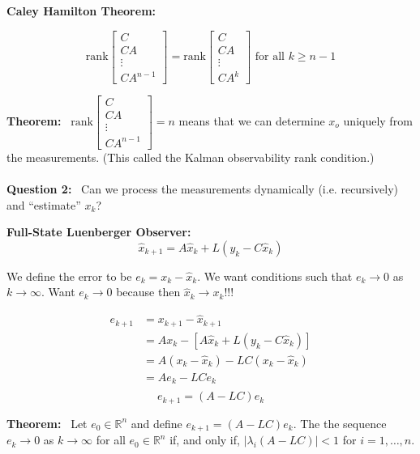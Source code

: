 \documentclass[letterpaper]{article}
\newcommand{\real}{\mathbb R}  %
\begin{document}
\textbf{Caley Hamilton Theorem:}

$$\text{rank} \left[ \begin{array}{c} C \\ CA \\ \vdots \\ CA^{n-1} \end{array} \right] = \text{rank} \left[ \begin{array}{c} C \\ CA \\ \vdots \\ CA^{k} \end{array} \right] \text{ for all } k \ge n-1$$

\textbf{Theorem:}~ $\text{rank} \left[ \begin{array}{c} C \\ CA \\ \vdots \\ CA^{n-1} \end{array} \right] = n$
means that we can determine $x_o$ uniquely from the measurements. (This called the Kalman observability rank condition.) \\ \\

\textbf{Question 2:}~ Can we process the measurements dynamically (i.e. recursively) and ``estimate'' $x_k$?

\textbf{Full-State Luenberger Observer:}
$$\hat{x}_{k+1} = A\hat{x}_k + L(y_k - C\hat{x}_k)$$

We define the error to be $e_k = x_k - \hat{x}_k$. We want conditions such that $e_k \to 0$ as  $k \rightarrow \infty$. Want $e_k \rightarrow 0$ because then $\hat{x}_k \rightarrow x_k$!!!

\begin{align*}
e_{k+1} & = x_{k+1} - \hat{x}_{k+1}\\
& = Ax_k - \left[A\hat{x}_k+L(y_k - C\hat{x}_k)\right]\\
& = A(x_k - \hat{x}_k) - LC(x_k - \hat{x}_k)\\
& = Ae_k-LCe_k\\
\end{align*}
$$\boxed{e_{k+1} = (A-LC)e_k}$$



\textbf{Theorem:}~ Let $e_0 \in \real^n$ and define $e_{k+1} = (A-LC)e_k$. The the sequence $e_k \rightarrow 0$ as $k \rightarrow \infty $ for all $e_0 \in \real^n$ if, and only if, $|\lambda_i(A-LC) | < 1$ for $i = 1,\ldots,n$.
\end{document}
